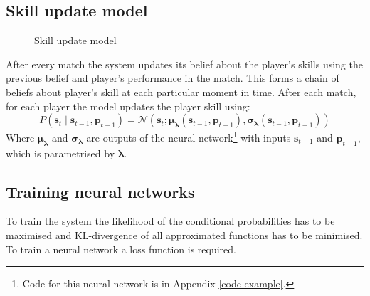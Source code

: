 \documentclass[12pt,a4paper]{book}
\newcommand\bs[1]{\boldsymbol{#1}}
\begin{document}
\subsection{Skill update model}
\begin{figure}[ht]
\centering
{}
\caption{Skill update model}
\label{fig:skill-update}
\end{figure}
After every match the system updates its belief about the player's skills using the previous belief and player's performance in the match.
This forms a chain of beliefs about player's skill at each particular moment in time.
After each match, for each player the model updates the player skill using:
\begin{equation*}
P(\bs{s}_t\mid \bs{s}_{t-1},\bs{p}_{t-1}) = \mathcal{N}(\bs{s}_t;\bs{\mu_\lambda}(\bs{s}_{t-1},\bs{p}_{t-1}),\bs{\sigma_\lambda}(\bs{s}_{t-1},\bs{p}_{t-1}))
\end{equation*}
Where $\bs{\mu_\lambda}$ and $\bs{\sigma_\lambda}$ are outputs of the neural network\footnote{Code for this neural network is in Appendix \ref{code-example}.} with inputs $\bs{s}_{t-1}$ and $\bs{p}_{t-1}$, which is parametrised by $\bs{\lambda}$.

\subsection{Training neural networks}
To train the system the likelihood of the conditional probabilities has to be maximised and KL-divergence of all approximated functions has to be minimised.
To train a neural network a loss function is required.
\end{document}
